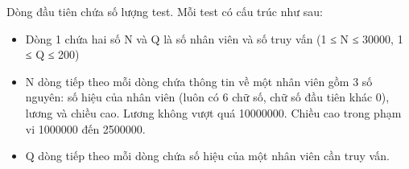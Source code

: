 Dòng đầu tiên chứa số lượng test. Mỗi test có cấu trúc như sau:  
\begin{itemize}
	\item     Dòng 1 chứa hai số N và Q là số nhân viên và số truy vấn (1 ≤ N ≤ 30000, 1 ≤ Q ≤ 200)   
	\item     N dòng tiếp theo mỗi dòng chứa thông tin về một nhân viên gồm 3 số nguyên: số hiệu của nhân viên (luôn có 6 chữ số, chữ số đầu tiên khác 0), lương và chiều cao. Lương không vượt quá 10000000. Chiều cao trong phạm vi 1000000 đến 2500000.   
	\item     Q dòng tiếp theo mỗi dòng chứa số hiệu của một nhân viên cần truy vấn.   
\end{itemize}